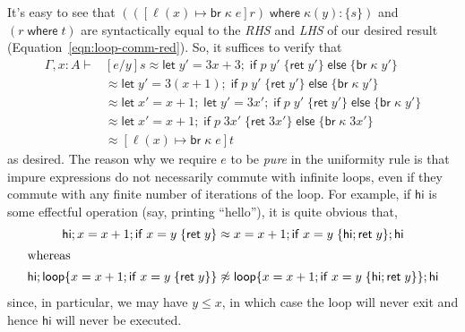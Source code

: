 \documentclass[acmsmall,screen,review]{acmart}
\newcommand{\ms}[1]{\ensuremath{\mathsf{#1}}}
\newcommand{\lto}{:}
\newcommand{\letexpr}[3]{\ensuremath{\ms{let}\;#1 = #2;\;#3}}
\newcommand{\brb}[2]{\ms{br}\;#1\;#2}
\newcommand{\where}[2]{#1\;\ms{where}\;#2}
\newcommand{\wbranch}[3]{#1(#2) \lto \{#3\}}
\newcommand{\bhyp}[2]{#1 : #2}
\newcommand{\teqv}{\approx}
\begin{document}
It's easy to see that $(\where{([\ell(x) \mapsto \brb{\kappa}{e}]r)}{\wbranch{\kappa}{y}{s}})$ and
$(\where{r}{t})$ are syntactically equal to the \emph{RHS} and \emph{LHS} of our desired result
(Equation~\ref{eqn:loop-comm-red}). So, it suffices to verify that
\begin{align*}
  \Gamma, \bhyp{x}{A} \vdash 
  & [e/y]s
  \teqv \letexpr{y'}{3x + 3}{\ms{if}\;p\;y'\;\{\ms{ret}\;y'\}\;\ms{else}\;\{\brb{\kappa}{y'}\}} \\
  & \teqv \letexpr{y'}{3(x + 1)}{\ms{if}\;p\;y'\;\{\ms{ret}\;y'\}\;\ms{else}\;\{\brb{\kappa}{y'}\}} \\
  & \teqv \letexpr{x'}{x + 1}{
      \letexpr{y'}{3x'}{\ms{if}\;p\;y'\;\{\ms{ret}\;y'\}\;\ms{else}\;\{\brb{\kappa}{y'}\}}} \\
  & \teqv \letexpr{x'}{x + 1}{
      \ms{if}\;p\;3x'\;\{\ms{ret}\;3x'\}\;\ms{else}\;\{\brb{\kappa}{3x'}\}} \\
  & \teqv [\ell(x) \mapsto \brb{\kappa}{e}]t
\end{align*}
as desired.
%
The reason why we require $e$ to be \emph{pure} in the uniformity rule is that impure expressions do
not necessarily commute with infinite loops, even if they commute with any finite number of
iterations of the loop. For example, if $\ms{hi}$ is some effectful operation (say, printing
``hello''), it is quite obvious that,
\begin{align}
  \ms{hi} ; x = x + 1 ; \ms{if}\;x = y\;\{\ms{ret}\;y\}
  & \teqv 
  x = x + 1 
  ; \ms{if}\;x = y\;\{\ms{hi} ; \ms{ret}\;y\} 
  ;  \ms{hi} \\
  \intertext{whereas}
  \ms{hi} ; \ms{loop} \{ x = x + 1 ; \ms{if}\;x = y\;\{\ms{ret}\;y\} \} 
  &\not\teqv
  \ms{loop} \{ x = x + 1 ;  \ms{if}\;x = y\;\{\ms{hi} ; \ms{ret}\;y\} \} ; \ms{hi}
\end{align}
since, in particular, we may have $y \leq x$, in which case the loop will never exit and hence
$\ms{hi}$ will never be executed.
\end{document}
